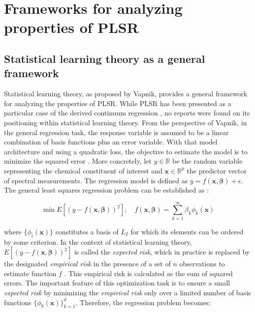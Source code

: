 \documentclass[journal=ancham,manuscript=article]{achemso}
\begin{document}

\section{Frameworks for analyzing properties of PLSR}

\subsection{Statistical learning theory as a general framework}

Statistical learning theory, as proposed by Vapnik\cite{Vapnik2019,Vapnik2000,Chapelle2002}, provides a general framework for analyzing the properties of PLSR. While PLSR has been presented as a particular case of the derived continuum regression \cite{Stone1990}, no reports were found on its positioning within statistical learning theory. From the perspective of Vapnik, in the general regression task, the response variable is assumed to be a linear combination of basis functions plus an error variable. With that model architecture and using a quadratic loss, the objective to estimate the model is to minimize the squared error \cite{Chapelle2002}. More concretely, let $y \in \mathbb{R}$ be the random variable representing the chemical constituent of interest and  $\mathbf{x} \in \mathbb{R}^{p}$ the predictor vector of spectral measurements. The regression model is defined as $y = f(\mathbf{x}, \boldsymbol{\beta}) + \epsilon$.  The general least squares regression problem can be established as \cite{Chapelle2002}:

\begin{equation}
    \min E \left[ (y-f(\mathbf{x}, \boldsymbol{\beta}))^2\right]; \quad f(\mathbf{x}, \boldsymbol{\beta}) = \sum_{k=1}^{\infty} \beta_k \phi_{k}(\mathbf{x})
    \label{eq_general_regression_problem}
\end{equation}

where $\{\phi_{i}(\mathbf{x})\}$ constitutes a basis of $L_2$ for which its elements can be ordered by some criterion. In the context of statistical learning theory, $E \left[ (y-f(\mathbf{x}, \boldsymbol{\beta}))^2\right]$ is called the \emph{expected risk}, which in practice is replaced by the designated \emph{empirical risk} in the presence of a set of $n$ observations to estimate function $f$ \cite{Vapnik2000}. This empirical risk is calculated as the sum of squared errors. The important feature of this optimization task is to ensure a small \emph{expected risk} by minimizing the \emph{empirical risk} only over a limited number of basis functions $\{\phi_{k}(\mathbf{x})\}_{k=1}^d$. Therefore, the regression problem becomes:
\end{document}
